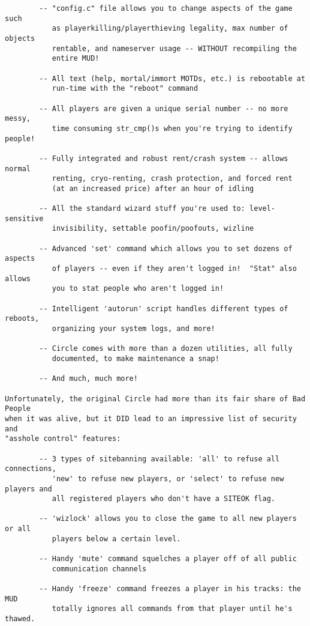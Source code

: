 \documentclass[11pt]{article}
\begin{document}
\begin{verbatim}
        -- "config.c" file allows you to change aspects of the game such
           as playerkilling/playerthieving legality, max number of objects
           rentable, and nameserver usage -- WITHOUT recompiling the
           entire MUD!

        -- All text (help, mortal/immort MOTDs, etc.) is rebootable at
           run-time with the "reboot" command

        -- All players are given a unique serial number -- no more messy,
           time consuming str_cmp()s when you're trying to identify people!

        -- Fully integrated and robust rent/crash system -- allows normal
           renting, cryo-renting, crash protection, and forced rent
           (at an increased price) after an hour of idling

        -- All the standard wizard stuff you're used to: level-sensitive
           invisibility, settable poofin/poofouts, wizline

        -- Advanced 'set' command which allows you to set dozens of aspects
           of players -- even if they aren't logged in!  "Stat" also allows
           you to stat people who aren't logged in!

        -- Intelligent 'autorun' script handles different types of reboots,
           organizing your system logs, and more!

        -- Circle comes with more than a dozen utilities, all fully
           documented, to make maintenance a snap!

        -- And much, much more!

Unfortunately, the original Circle had more than its fair share of Bad People
when it was alive, but it DID lead to an impressive list of security and
"asshole control" features:

        -- 3 types of sitebanning available: 'all' to refuse all connections,
           'new' to refuse new players, or 'select' to refuse new players and
           all registered players who don't have a SITEOK flag.

        -- 'wizlock' allows you to close the game to all new players or all
           players below a certain level.

        -- Handy 'mute' command squelches a player off of all public
           communication channels

        -- Handy 'freeze' command freezes a player in his tracks: the MUD
           totally ignores all commands from that player until he's thawed.


\end{verbatim}
\end{document}
